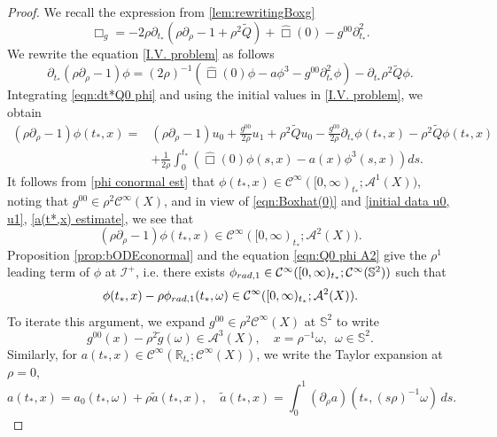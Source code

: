 \documentclass[10pt,a4paper,reqno]{amsart}
\newcommand{\CI}{\mathcal{C}^\infty}
\newcommand{\RR}{\mathbb{R}}
\newcommand{\A}{\mathcal{A}}
\newcommand{\pa}{\partial}
\newcommand{\ti}{\tilde}
\renewcommand{\S}{{\mathbb S}}
\theoremstyle{definition}
\theoremstyle{remark}
\numberwithin{equation}{section}
\newcommand{\ts}{t_*}
\newcommand{\wh}{\widehat}
\begin{document}
\begin{proof}
We recall the expression from \cref*{lem:rewritingBoxg}
\[
	\Box_g = -2\rho\pa_{\ts}(\rho\pa_{\rho}-1 + \rho^2\widetilde{Q}) + \wh\Box(0) - g^{00}\pa_{t_*}^2.
\]
We rewrite the equation \eqref{I.V. problem} as follows
\begin{equation}
\label{eqn:dt*Q0 phi}
    \pa_{\ts}(\rho\pa_{\rho}-1)\phi = (2\rho)^{-1}(\wh\Box(0)\phi - a\phi^3 - g^{00}\pa_{t_*}^2 \phi) - \pa_{t_*}\rho^2\widetilde{Q} \phi.
\end{equation}
Integrating \eqref{eqn:dt*Q0 phi} and using the initial values in \eqref{I.V. problem}, we obtain
	\begin{equation}
		\label{eqn:Q0 phi full}
		\begin{split}
			(\rho\pa_{\rho}-1)\phi(t_*,x) = &(\rho\pa_{\rho}-1)u_0 + \frac{g^{00}}{2\rho} u_1 + \rho^2\widetilde{Q} u_0 - \frac{g^{00}}{2\rho}\pa_{\ts}\phi(\ts,x) - \rho^2\widetilde{Q}\phi(\ts,x) \\
			&+\frac{1}{2\rho}\int_0^{\ts} (\wh\Box(0)\phi(s,x)-a(x)\phi^3(s,x)) ds.
		\end{split}
	\end{equation}
It follows from \eqref{phi conormal est} that $\phi(\ts,x)\in \CI([0,\infty)_{\ts};\A^1(X))$, noting that $g^{00}\in \rho^2\CI(X)$, and in view of \eqref{eqn:Boxhat(0)} and \eqref{initial data u0, u1}, \eqref{a(t*,x) estimate}, we see that
	\begin{equation}
	\label{eqn:Q0 phi A2}
		(\rho\pa_{\rho}-1)\phi(t_*,x) \in \CI([0,\infty)_{\ts};\A^2(X)).
	\end{equation}
Proposition \ref{prop:bODEconormal} and the equation \eqref{eqn:Q0 phi A2} 
give the $\rho^1$ leading term of $\phi$ at $\mathscr{I}^+$, i.e. there exists $\phi_{\rm{rad},1}\in \CI([0,\infty)_{t_*};\CI(\S^2))$ such that
	\begin{equation}
		\label{rad field 1st}
		\phi(t_*,x) - \rho \phi_{\rm{rad},1}(\ts,\omega) \in \CI([0,\infty)_{\ts};\A^{2}(X)).
	\end{equation}
To iterate this argument, we expand $g^{00}\in \rho^2\CI(X)$ at $\mathbb{S}^2$ to write
\begin{equation}
\label{eqn:tilde g, g00}
    g^{00}(x) - \rho^2 \ti g(\omega) \in \A^3(X),\quad x=\rho^{-1}\omega,\ \;\omega\in\mathbb{S}^2 .
\end{equation}
Similarly, for $a(\ts,x)\in\CI(\RR_{\ts};\CI(X))$, we write the Taylor expansion at $\rho=0$,
\begin{equation}
\label{eqn:a a0 atilde}
    a(\ts,x) = a_0(\ts,\omega) + \rho\tilde{a}(\ts,x),\quad \tilde{a}(\ts,x) = \int_0^1 (\pa_\rho a) (\ts,(s\rho)^{-1}\omega)\,ds.

\end{equation}
\end{proof}
\end{document}
